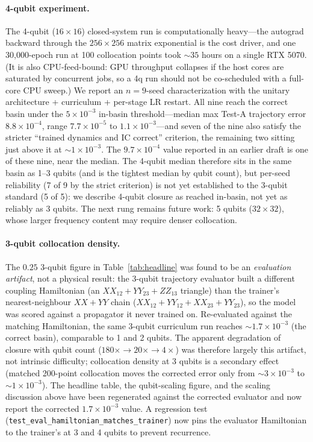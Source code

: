 \documentclass[11pt]{article}
\begin{document}
\paragraph{4-qubit experiment.}
The 4-qubit ($16\times16$) closed-system run is computationally heavy---the autograd backward through the $256 \times 256$ matrix exponential is the cost driver, and one 30{,}000-epoch run at 100 collocation points took $\sim 35$ hours on a single RTX 5070. (It is also CPU-feed-bound: GPU throughput collapses if the host cores are saturated by concurrent jobs, so a 4q run should not be co-scheduled with a full-core CPU sweep.) We report an $n = 9$-seed characterization with the unitary architecture + curriculum + per-stage LR restart. All nine reach the correct basin under the $5\times10^{-3}$ in-basin threshold---median max Test-A trajectory error $8.8\times10^{-4}$, range $7.7\times10^{-5}$ to $1.1\times10^{-3}$---and seven of the nine also satisfy the stricter ``trained dynamics and IC correct'' criterion, the remaining two sitting just above it at $\sim\!1\times10^{-3}$. The $9.7\times10^{-4}$ value reported in an earlier draft is one of these nine, near the median. The 4-qubit median therefore sits in the same basin as 1--3 qubits (and is the tightest median by qubit count), but per-seed reliability (7 of 9 by the strict criterion) is not yet established to the 3-qubit standard (5 of 5): we describe 4-qubit closure as reached in-basin, not yet as reliably as 3 qubits. The next rung remains future work: 5 qubits ($32\times32$), whose larger frequency content may require denser collocation.

\paragraph{3-qubit collocation density.}
The $0.25$ 3-qubit figure in Table~\ref{tab:headline} was found to be an \emph{evaluation artifact}, not a physical result: the 3-qubit trajectory evaluator built a different coupling Hamiltonian (an $XX_{12}+YY_{23}+ZZ_{13}$ triangle) than the trainer's nearest-neighbour $XX{+}YY$ chain ($XX_{12}+YY_{12}+XX_{23}+YY_{23}$), so the model was scored against a propagator it never trained on. Re-evaluated against the matching Hamiltonian, the same 3-qubit curriculum run reaches $\sim\!1.7\times10^{-3}$ (the correct basin), comparable to 1 and 2 qubits. The apparent degradation of closure with qubit count ($180\times \to 20\times \to 4\times$) was therefore largely this artifact, not intrinsic difficulty; collocation density at 3 qubits is a secondary effect (matched 200-point collocation moves the corrected error only from $\sim\!3\times10^{-3}$ to $\sim\!1\times10^{-3}$). The headline table, the qubit-scaling figure, and the scaling discussion above have been regenerated against the corrected evaluator and now report the corrected $1.7\times10^{-3}$ value. A regression test (\texttt{test\_eval\_hamiltonian\_matches\_trainer}) now pins the evaluator Hamiltonian to the trainer's at 3 and 4 qubits to prevent recurrence.
\end{document}
